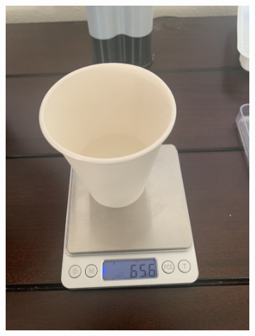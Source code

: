 \documentclass[twoside]{article}
\begin{document}
\begin{figure}[H]
\begin{subfigure}[b]{0.33\linewidth}
		\includegraphics[width=\textwidth]{part a}
	\end{subfigure}%
	\begin{subfigure}[b]{0.33\linewidth}
		\centering

\end{subfigure}
\end{figure}
\end{document}
